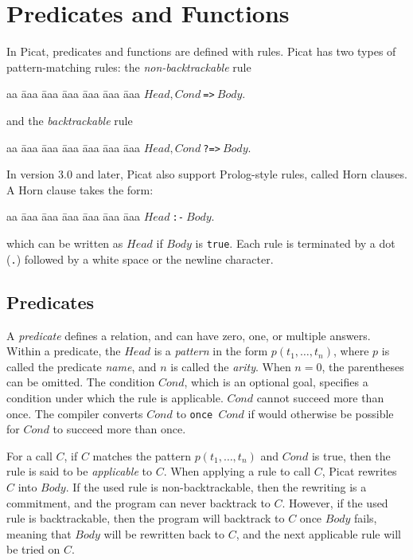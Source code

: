 \chapter{\label{chapter:predicates}Predicates and Functions}
In Picat, predicates and functions are defined with rules. Picat has two types of pattern-matching rules: the \emph{non-backtrackable} rule 
\begin{tabbing}
aa \= aaa \= aaa \= aaa \= aaa \= aaa \= aaa \kill
\> \> $Head, Cond\ $\verb+=>+$\ Body$. 
\end{tabbing}
and the \emph{backtrackable} rule 
\begin{tabbing}
aa \= aaa \= aaa \= aaa \= aaa \= aaa \= aaa \kill
\> \> $Head, Cond\ $\verb+?=>+$\ Body$. 
\end{tabbing}
In version 3.0 and later, Picat also support Prolog-style rules, called Horn clauses. A Horn clause takes the form:
\begin{tabbing}
aa \= aaa \= aaa \= aaa \= aaa \= aaa \= aaa \kill
\> \> $Head\ $\verb+:-+$\ Body$. 
\end{tabbing}
which can be written as $Head$ if $Body$ is \texttt{true}. Each rule is terminated by a dot (\verb+.+) followed by a white space or the newline character. 

\section{Predicates}
A \emph{predicate} defines a relation, and can have zero, one, or multiple answers. Within a predicate, the $Head$ is a \emph{pattern} in the form $p(t_1,\ldots,t_n)$, where $p$ is called the predicate \emph{name}, and $n$ is called the \emph{arity}. When $n=0$, the parentheses can be omitted. The condition $Cond$, which is an optional goal, specifies a condition under which the rule is applicable. $Cond$ cannot succeed more than once. The compiler converts $Cond$ to \texttt{once $Cond$} if would otherwise be possible for $Cond$ to succeed more than once.

For a call $C$, if $C$ matches the pattern $p(t_1,\ldots,t_n)$ and $Cond$ is true, then the rule is said to be \emph{applicable} to $C$. When applying a rule to call $C$, Picat rewrites $C$ into $Body$. If the used rule is non-backtrackable, then the rewriting is a commitment, and the program can never backtrack to $C$. However, if the used rule is backtrackable, then the program will backtrack to $C$ once $Body$ fails, meaning that $Body$ will be rewritten back to $C$, and the next applicable rule will be tried on $C$. 

